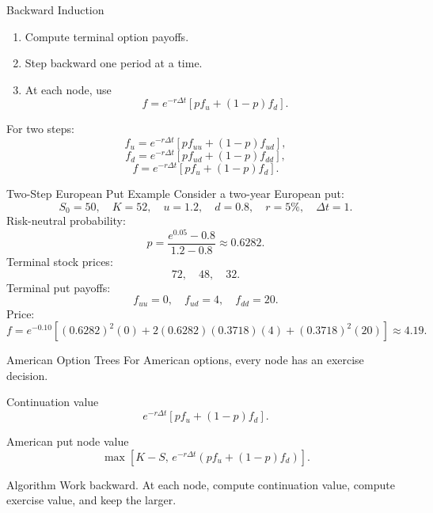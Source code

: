 \documentclass[aspectratio=169,11pt]{beamer}
\begin{document}
\begin{frame}{Backward Induction}
    \begin{enumerate}
        \item Compute terminal option payoffs.
        \item Step backward one period at a time.
        \item At each node, use
        \[
            f=e^{-r\Delta t}\left[p f_u+(1-p)f_d\right].
        \]
    \end{enumerate}

    \vspace{0.6em}
    For two steps:
    \[
        f_u=e^{-r\Delta t}\left[p f_{uu}+(1-p)f_{ud}\right],
    \]
    \[
        f_d=e^{-r\Delta t}\left[p f_{ud}+(1-p)f_{dd}\right],
    \]
    \[
        f=e^{-r\Delta t}\left[p f_u+(1-p)f_d\right].
    \]
\end{frame}

\begin{frame}{Two-Step European Put Example}
    \small
    Consider a two-year European put:
    \[
        S_0=50,\quad K=52,\quad u=1.2,\quad d=0.8,\quad r=5\%,\quad \Delta t=1.
    \]
    Risk-neutral probability:
    \[
        p=\frac{e^{0.05}-0.8}{1.2-0.8}\approx 0.6282.
    \]
    Terminal stock prices:
    \[
        72,\quad 48,\quad 32.
    \]
    Terminal put payoffs:
    \[
        f_{uu}=0,\quad f_{ud}=4,\quad f_{dd}=20.
    \]
    Price:
    \[
        f=e^{-0.10}
        \left[(0.6282)^2(0)+2(0.6282)(0.3718)(4)+(0.3718)^2(20)\right]
        \approx 4.19.
    \]
\end{frame}

\begin{frame}{American Option Trees}
    For American options, every node has an exercise decision.

    \begin{block}{Continuation value}
        \[
            e^{-r\Delta t}\left[p f_u+(1-p)f_d\right].
        \]
    \end{block}

    \begin{block}{American put node value}
        \[
            \max\left[
                K-S,\,
                e^{-r\Delta t}\left(p f_u+(1-p)f_d\right)
            \right].
        \]
    \end{block}

    \begin{alertblock}{Algorithm}
        Work backward. At each node, compute continuation value, compute exercise value, and keep the larger.
    \end{alertblock}
\end{frame}
\end{document}
